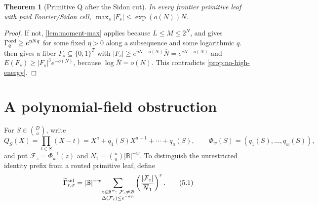 \documentclass[11pt,a4paper]{amsart}
\numberwithin{equation}{section}
\newtheorem{theorem}{Theorem}[section]
\theoremstyle{remark}
\newcommand{\B}{\mathbb B}
\newcommand{\Gord}{\Gamma^{\rm ord}}
\newcommand{\Gsid}{\Gamma^{\rm sid}}
\newcommand{\barN}{\overline N}
\begin{document}
\begin{theorem}[Primitive Q after the Sidon cut]\label{thm:primitive-q}
In every frontier primitive leaf with paid Fourier/Sidon cell, \(\max_s|F_s|\le\exp(o(N))\barN\).
\end{theorem}

\begin{proof}
If not, \cref{lem:moment-max} applies because
\(L\le M\le2^N\), and gives \(\Gord_q\ge e^{\eta Nq}\) for some fixed
\(\eta>0\) along a subsequence and some logarithmic \(q\).
 then gives a fiber
\(F_s\subseteq\{0,1\}^{T}\) with
\(|F_s|\ge e^{\eta N-o(N)}\barN=e^{cN-o(N)}\) and
\(E(F_s)\ge |F_s|^3e^{-o(N)}\), because \(\log\barN=o(N)\).
This contradicts \cref{prop:no-high-energy}.
\end{proof}

\section{A polynomial-field obstruction}\label{sec:quotient-obstruction}

For \(S\in\binom Da\), write
\[
 Q_S(X)=\prod_{t\in S}(X-t)
       =X^a+q_1(S)X^{a-1}+\cdots+q_a(S),
 \qquad \Phi_w(S)=(q_1(S),\ldots,q_w(S)),
\]
and put \(\mathcal F_z=\Phi_w^{-1}(z)\) and
\(\barN_1=\binom na|\B|^{-w}\).  To distinguish the unrestricted identity
prefix from a routed primitive leaf, define
\[
 \widetilde\Gsid_{r,\sigma}
 =|\B|^{-w}\!\sum_{\substack{z\in\B^w:\ \mathcal F_z\ne\varnothing\\
                         \Delta(\mathcal F_z)\le e^{-\sigma n}}}
       \left(\frac{|\mathcal F_z|}{\barN_1}\right)^r .
 \tag{5.1}\label{eq:unrestricted-sidon-moment}
\]
\end{document}
